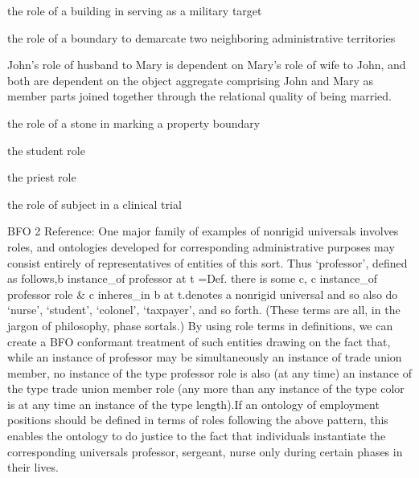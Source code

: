 \documentclass[letterpaper,10pt,english]{sphinxmanual}
\begin{document}
\begin{sphinxShadowBox}

\sphinxAtStartPar
the role of a building in serving as a military target

\sphinxAtStartPar
the role of a boundary to demarcate two neighboring administrative territories

\sphinxAtStartPar
John’s role of husband to Mary is dependent on Mary’s role of wife to John, and both are dependent on the object aggregate comprising John and Mary as member parts joined together through the relational quality of being married.

\sphinxAtStartPar
the role of a stone in marking a property boundary

\sphinxAtStartPar
the student role

\sphinxAtStartPar
the priest role

\sphinxAtStartPar
the role of subject in a clinical trial
\end{sphinxShadowBox}

\begin{sphinxShadowBox}

\sphinxAtStartPar
BFO 2 Reference: One major family of examples of non\sphinxhyphen{}rigid universals involves roles, and ontologies developed for corresponding administrative purposes may consist entirely of representatives of entities of this sort. Thus ‘professor’, defined as follows,b instance\_of professor at t =Def. there is some c, c instance\_of professor role \& c inheres\_in b at t.denotes a non\sphinxhyphen{}rigid universal and so also do ‘nurse’, ‘student’, ‘colonel’, ‘taxpayer’, and so forth. (These terms are all, in the jargon of philosophy, phase sortals.) By using role terms in definitions, we can create a BFO conformant treatment of such entities drawing on the fact that, while an instance of professor may be simultaneously an instance of trade union member, no instance of the type professor role is also (at any time) an instance of the type trade union member role (any more than any instance of the type color is at any time an instance of the type length).If an ontology of employment positions should be defined in terms of roles following the above pattern, this enables the ontology to do justice to the fact that individuals instantiate the corresponding universals \textendash{}  professor, sergeant, nurse \textendash{} only during certain phases in their lives.
\end{sphinxShadowBox}
\end{document}
